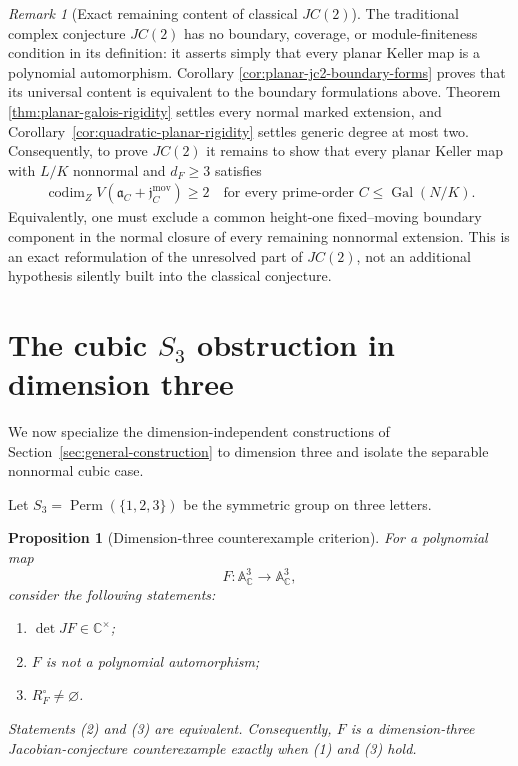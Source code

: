 \documentclass[11pt]{article}
\newtheorem{proposition}[theorem]{Proposition}
\theoremstyle{remark}
\newtheorem*{remark}{Remark}
\theoremstyle{definition}
\DeclareMathOperator{\Gal}{Gal}
\newcommand{\A}{\mathbb A}
\newcommand{\C}{\mathbb C}
\begin{document}
\begin{remark}[Exact remaining content of classical \(JC(2)\)]
\label{rem:exact-remaining-jc2}
The traditional complex conjecture \(JC(2)\) has no boundary, coverage, or
module-finiteness condition in its definition: it asserts simply that every
planar Keller map is a polynomial automorphism.  Corollary
\ref{cor:planar-jc2-boundary-forms} proves that its universal content is
equivalent to the boundary formulations above.  Theorem
\ref{thm:planar-galois-rigidity} settles every normal marked extension, and
Corollary~\ref{cor:quadratic-planar-rigidity} settles generic degree at most
two.  Consequently, to prove \(JC(2)\) it remains to show that every planar
Keller map with \(L/K\) nonnormal and \(d_F\geq3\) satisfies
\[
  \begin{gathered}
    \operatorname{codim}_Z
    V\!\left(\mathfrak a_C+\mathfrak j_C^{\mathrm{mov}}\right)\geq2
    \quad\text{for every prime-order }C\leq\Gal(N/K).
  \end{gathered}
\]
Equivalently, one must exclude a common height-one fixed--moving boundary
component in the normal closure of every remaining nonnormal extension.
This is an exact
reformulation of the unresolved part of \(JC(2)\), not an additional
hypothesis silently built into the classical conjecture.
\end{remark}

\section{\texorpdfstring{The cubic \(S_3\) obstruction in dimension three}
  {The cubic S3 obstruction in dimension three}}
\label{sec:cubic-s3-obstruction}

We now specialize the dimension-independent constructions of
Section~\ref{sec:general-construction} to dimension three and isolate the
separable nonnormal cubic case.

Let \(S_3=\operatorname{Perm}(\{1,2,3\})\) be the symmetric group on
three letters.

\begin{proposition}[Dimension-three counterexample criterion]
\label{prop:dimension-three-counterexample-criterion}
For a polynomial map
\[
  F\colon\A^3_{\C}\longrightarrow\A^3_{\C},
\]
consider the following statements:
\begin{enumerate}[label=\textup{(\arabic*)}]
  \item \(\det JF\in\C^\times\);
  \item \(F\) is not a polynomial automorphism;
  \item \(R_F^\circ\neq\varnothing\).
\end{enumerate}
Statements \textup{(2)} and \textup{(3)} are equivalent.  Consequently,
\(F\) is a dimension-three Jacobian-conjecture counterexample exactly
when \textup{(1)} and \textup{(3)} hold.
\end{proposition}
\end{document}
